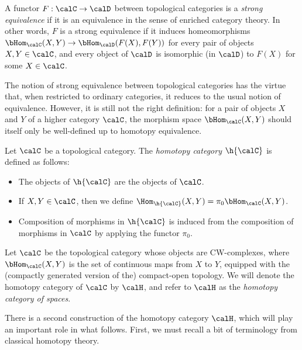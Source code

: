 \begin{definition}
A functor $F: \calC \rightarrow \calD$ between topological categories is a  {\it strong equivalence} if it is an equivalence in the sense of enriched category theory. In other words, $F$ is a strong equivalence if it induces homeomorphisms $\bHom_{\calC}(X,Y) \rightarrow \bHom_{\calD}(F(X),F(Y))$ for every pair of objects $X,Y \in \calC$, and every object of $\calD$ is isomorphic (in $\calD$) to $F(X)$ for some $X \in \calC$.
\end{definition}

The notion of strong equivalence between topological categories has the virtue that, when restricted to ordinary categories, it reduces to the usual notion of equivalence. However, it is still not the right definition: for a pair of objects $X$ and $Y$ of a higher category $\calC$, the morphism space $\bHom_{\calC}(X,Y)$ should itself only be well-defined up to homotopy equivalence. 

\begin{definition}\label{vergen}
Let $\calC$ be a topological category. The {\it homotopy category} $\h{\calC}$
is defined as follows:
\begin{itemize}
\item The objects of $\h{\calC}$ are the objects of $\calC$.
\item If $X,Y \in \calC$, then we define $\Hom_{\h{\calC}}(X,Y)= \pi_0 \bHom_{\calC}(X,Y)$.
\item Composition of morphisms in $\h{\calC}$ is induced from the composition of morphisms
in $\calC$ by applying the functor $\pi_0$.
\end{itemize}
\end{definition}

\begin{example}
Let $\calC$ be the topological category whose objects are CW-complexes, where
$\bHom_{\calC}(X,Y)$ is the set of continuous maps from $X$ to $Y$, equipped with the
(compactly generated version of the) compact-open topology. We will denote the homotopy category of $\calC$ by $\calH$, and refer to $\calH$ as the {\it homotopy category of spaces}.
\end{example}

There is a second construction of the homotopy category $\calH$, which will play an important role in what follows. First, we must recall a bit of terminology from classical homotopy theory.

